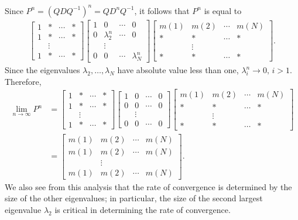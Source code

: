 \documentclass{stml-l}
\theoremstyle{definition}
\numberwithin{equation}{chapter}
\numberwithin{figure}{chapter}
\numberwithin{figure}{section}
\begin{document}
Since $P^{n}=(QDQ^{-1})^{n}=QD^{n}Q^{-1}$, it follows that $P^{n}$
is equal to
\begin{align*}
\left[\begin{array}{cccc}
1 & \ast & \cdots & \ast\\
1 & \ast & \cdots & \ast\\
 & \vdots & & \\
1 & \ast & \cdots & \ast
\end{array}\right]\left[\begin{array}{cccc}
1 & 0 & \cdots & 0\\
0 & \lambda_{2}^{n} & \cdots & 0\\
 & \vdots & & \\
0 & 0 & \cdots & \lambda_{N}^{n}
\end{array}\right]\left[\begin{array}{cccc}
m(1) & m(2) & \cdots & m(N)\\
\ast & \ast & \cdots & \ast\\
 & \vdots & & \\
\ast & \ast & \cdots & \ast
\end{array}\right].
\end{align*}
Since the eigenvalues $\lambda_{2},\ldots,\lambda_{N}$ have absolute
value less than one, $\lambda_{i}^{n}\rightarrow 0,\,i>1$. Therefore,
\begin{align*}
\lim\limits_{n\rightarrow\infty}P^{n}&=\left[\begin{array}{cccc}
1 & \ast & \cdots & \ast\\
1 & \ast & \cdots & \ast\\
 & \vdots &  & \\
1 & \ast & \cdots & \ast
\end{array}\right]\left[\begin{array}{cccc}
1 & 0 & \cdots & 0\\
0 & 0 & \cdots & 0\\
 & \vdots & & \\
0 & 0 & \cdots & 0
\end{array}\right]\left[\begin{array}{cccc}
m(1) & m(2) & \cdots & m(N)\\
\ast & \ast & \cdots & \ast\\
 &  \vdots &  & \\
\ast & \ast & \cdots & \ast
\end{array}\right]\\
&=\left[\begin{array}{cccc}
m(1) & m(2) & \cdots & m(N)\\
m(1) & m(2) & \cdots & m(N)\\
 & \vdots & & \\
m(1) & m(2) & \cdots & m(N)
\end{array}\right].
\end{align*}
We also see from this analysis that the rate of convergence is
determined by the size of the other eigenvalues; in particular, the
size of the second largest eigenvalue $\lambda_{2}$ is critical in
determining the rate of convergence.
\end{document}
